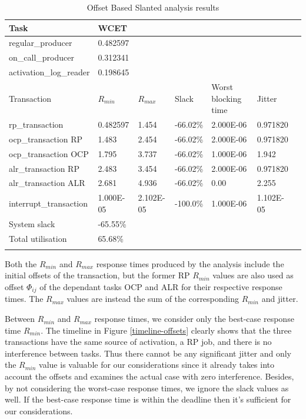 \documentclass{article}
\begin{document}
\begin{longtable}{lllllll}
   \toprule
   Task & WCET \\
   \midrule
   regular\_producer & 0.482597 \\
   on\_call\_producer & 0.312341 \\
   activation\_log\_reader & 0.198645 \\
   \toprule
   \toprule
   Transaction & $R_{min}$ & $R_{max}$ & Slack & Worst blocking time & Jitter \\
   \midrule
   rp\_transaction & 0.482597 & 1.454 & -66.02\% &  2.000E-06 & 0.971820 \\
   ocp\_transaction RP & 1.483 & 2.454 & -66.02\% & 2.000E-06 & 0.971820 \\
   ocp\_transaction OCP & 1.795 & 3.737 & -66.02\% & 1.000E-06 & 1.942 \\
   alr\_transaction RP & 2.483 & 3.454 & -66.02\% & 2.000E-06 & 0.971820 \\
   alr\_transaction ALR & 2.681 & 4.936 & -66.02\% & 0.00 & 2.255 \\
   interrupt\_transaction & 1.000E-05 & 2.102E-05 & -100.0\% & 1.000E-06 & 1.102E-05 \\
   \toprule
   \toprule
   System slack & -65.55\% \\
   Total utilisation & 65.68\% \\
   \bottomrule
   \caption{Offset Based Slanted analysis results}
\label{tab:rm-fps-24-ocp-44-alr-56}
\end{longtable}

Both the $R_{min}$ and $R_{max}$ response times produced by the analysis include the initial offsets of the transaction, but the former RP $R_{min}$ values are also used as offset $\Phi_{ij}$ of the dependant tasks OCP and ALR for their respective response times. The $R_{max}$ values are instead the sum of the corresponding $R_{min}$ and jitter.

Between $R_{min}$ and $R_{max}$ response times, we consider only the best-case response time $R_{min}$. The timeline in Figure \ref{timeline-offsets} clearly shows that the three transactions have the same source of activation, a RP job, and there is no interference between tasks. Thus there cannot be any significant jitter and only the $R_{min}$ value is valuable for our considerations since it already takes into account the offsets and examines the actual case with zero interference. Besides, by not considering the worst-case response times, we ignore the slack values as well. If the best-case response time is within the deadline then it's sufficient for our considerations.
\end{document}
